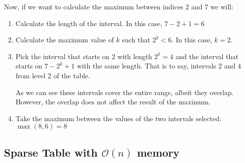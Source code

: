 \begin{figure}[h!]
\end{figure}

\noindent
Now, if we want to calculate the maximum between indices 2 and 7 we will:
\begin{enumerate}
		\setlength{\itemsep}{2pt}
		\item Calculate the length of the interval. In this case, $7-2+1=6$
		\item Calculate the maximum value of $k$  such that $2^k<6$. In this
				case, $k=2$.
		\item Pick the interval that starts on 2 with length $2^k=4$ and the
				interval that starts on $7-2^k+1$ with the same length. 
				That is to say, intervals 2 and 4 from level 2 of the table.

				As we can see these intervals cover the entire range, albeit 
				they overlap. However, the overlap does not affect the result
				of the maximum.
		\item Take the maximum between the values of the two intervals 
				selected: $\max(8,6)=8$
\end{enumerate}

\newpage
{}
\newpage

\subsection{Sparse Table with $\mathcal{O}(n)$ memory}

